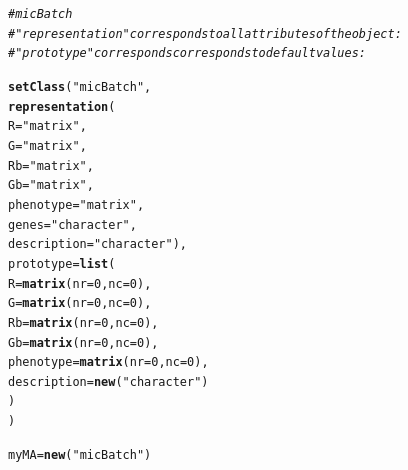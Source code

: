 \documentclass[10pt]{article}\usepackage[]{graphicx}\usepackage[]{color}
\makeatletter
\newcommand{\hlnum}[1]{\textcolor[rgb]{0.686,0.059,0.569}{#1}}%
\newcommand{\hlstr}[1]{\textcolor[rgb]{0.192,0.494,0.8}{#1}}%
\newcommand{\hlcom}[1]{\textcolor[rgb]{0.678,0.584,0.686}{\textit{#1}}}%
\newcommand{\hlstd}[1]{\textcolor[rgb]{0.345,0.345,0.345}{#1}}%
\newcommand{\hlkwb}[1]{\textcolor[rgb]{0.69,0.353,0.396}{#1}}%
\newcommand{\hlkwc}[1]{\textcolor[rgb]{0.333,0.667,0.333}{#1}}%
\newcommand{\hlkwd}[1]{\textcolor[rgb]{0.737,0.353,0.396}{\textbf{#1}}}%
\newenvironment{kframe}{%
 \def\at@end@of@kframe{}%
 \ifinner\ifhmode%
  \def\at@end@of@kframe{\end{minipage}}%
  \begin{minipage}{\columnwidth}%
 \fi\fi%
 \def\FrameCommand##1{\hskip\@totalleftmargin \hskip-\fboxsep
 \colorbox{shadecolor}{##1}\hskip-\fboxsep
     \hskip-\linewidth \hskip-\@totalleftmargin \hskip\columnwidth}%
 \MakeFramed {\advance\hsize-\width
   \@totalleftmargin\z@ \linewidth\hsize
   \@setminipage}}%
 {\par\unskip\endMakeFramed%
 \at@end@of@kframe}
\newenvironment{knitrout}{}{} %
\makeatother
\begin{document}
\begin{knitrout}
\color{fgcolor}\begin{kframe}
\begin{alltt}
\hlcom{# micBatch}
\hlcom{# "representation" corresponds to all attributes of the object:}
\hlcom{# "prototype" corresponds corresponds to default values:}

\hlkwd{setClass}\hlstd{(}\hlstr{"micBatch"}\hlstd{,}
    \hlkwd{representation}\hlstd{(}
        \hlkwc{R}\hlstd{=}\hlstr{"matrix"}\hlstd{,}
        \hlkwc{G}\hlstd{=}\hlstr{"matrix"}\hlstd{,}
        \hlkwc{Rb}\hlstd{=}\hlstr{"matrix"}\hlstd{,}
        \hlkwc{Gb}\hlstd{=}\hlstr{"matrix"}\hlstd{,}
        \hlkwc{phenotype}\hlstd{=}\hlstr{"matrix"}\hlstd{,}
        \hlkwc{genes}\hlstd{=}\hlstr{"character"}\hlstd{,}
        \hlkwc{description}\hlstd{=}\hlstr{"character"}\hlstd{),}
    \hlkwc{prototype}\hlstd{=}\hlkwd{list}\hlstd{(}
        \hlkwc{R}\hlstd{=}\hlkwd{matrix}\hlstd{(}\hlkwc{nr}\hlstd{=}\hlnum{0}\hlstd{,}\hlkwc{nc}\hlstd{=}\hlnum{0}\hlstd{),}
        \hlkwc{G}\hlstd{=}\hlkwd{matrix}\hlstd{(}\hlkwc{nr}\hlstd{=}\hlnum{0}\hlstd{,}\hlkwc{nc}\hlstd{=}\hlnum{0}\hlstd{),}
        \hlkwc{Rb}\hlstd{=}\hlkwd{matrix}\hlstd{(}\hlkwc{nr}\hlstd{=}\hlnum{0}\hlstd{,}\hlkwc{nc}\hlstd{=}\hlnum{0}\hlstd{),}
        \hlkwc{Gb}\hlstd{=}\hlkwd{matrix}\hlstd{(}\hlkwc{nr}\hlstd{=}\hlnum{0}\hlstd{,}\hlkwc{nc}\hlstd{=}\hlnum{0}\hlstd{),}
        \hlkwc{phenotype}\hlstd{=}\hlkwd{matrix}\hlstd{(}\hlkwc{nr}\hlstd{=}\hlnum{0}\hlstd{,}\hlkwc{nc}\hlstd{=}\hlnum{0}\hlstd{),}
        \hlkwc{description}\hlstd{=}\hlkwd{new}\hlstd{(}\hlstr{"character"}\hlstd{)}
            \hlstd{)}
    \hlstd{)}

\hlstd{myMA}\hlkwb{=}\hlkwd{new}\hlstd{(}\hlstr{"micBatch"}\hlstd{)}


\end{alltt}
\end{kframe}
\end{knitrout}
\end{document}
